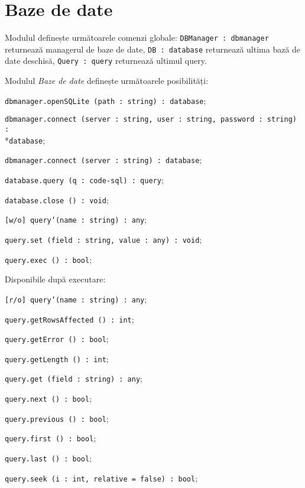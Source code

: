 \section{Baze de date}

Modulul definește următoarele comenzi globale: \texttt{DBManager : dbmanager} returnează managerul de baze de date, \texttt{DB : database} returnează ultima bază de date deschisă, \texttt{Query : query} returnează ultimul query.

Modulul \textit{Baze de date} definește următoarele posibilități:
\begin{icItems}
	\item \texttt{dbmanager.openSQLite (path : string) : database};
	\item \texttt{dbmanager.connect (server : string, user : string, password : string) :}\\*\texttt{database};
	\item \texttt{dbmanager.connect (server : string) : database};
	\item \texttt{database.query (q : code-sql) : query};
	\item \texttt{database.close () : void};
	\item \texttt{[w/o] query'(name : string) : any};
	\item \texttt{query.set (field : string, value : any) : void};
	\item \texttt{query.exec () : bool};
	\item Disponibile după executare:
	\begin{icItems}
		\item \texttt{[r/o] query'(name : string) : any};
		\item \texttt{query.getRowsAffected () : int};
		\item \texttt{query.getError () : bool};
		\item \texttt{query.getLength () : int};
		\item \texttt{query.get (field : string) : any};
		\item \texttt{query.next () : bool};
		\item \texttt{query.previous () : bool};
		\item \texttt{query.first () : bool};
		\item \texttt{query.last () : bool};
		\item \texttt{query.seek (i : int, relative = false) : bool};
	\end{icItems}
\end{icItems}

